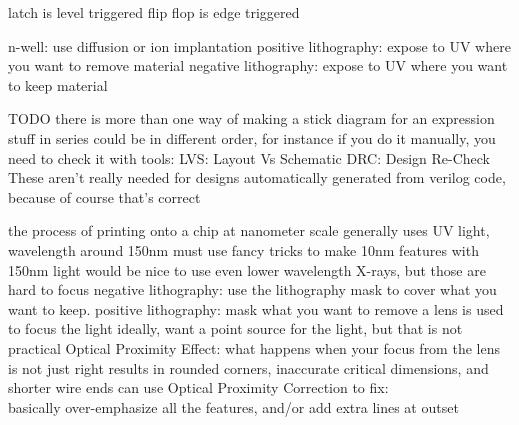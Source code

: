 \documentclass[12pt]{article}
\begin{document}
\begin{spacing}{0.8}
\begin{multicols*}{2}
\begin{flushleft}
\begin{outline}[longenum]
  \1 latch is level triggered
  \1 flip flop is edge triggered

  \1 n-well: use diffusion or ion implantation
  \1 positive lithography: expose to UV where you want to remove material
  \1 negative lithography: expose to UV where you want to keep material



  \1 TODO
  \1 there is more than one way of making a stick diagram for an expression
    \2 stuff in series could be in different order, for instance
  \1 if you do it manually, you need to check it with tools:
    \2 LVS: Layout Vs Schematic
    \2 DRC: Design Re-Check
    \2 These aren't really needed for designs automatically generated from verilog code, because of course that's correct

  \1 the process of printing onto a chip at nanometer scale
  \1 generally uses UV light, wavelength around 150nm
    \2 must use fancy tricks to make 10nm features with 150nm light
    \2 would be nice to use even lower wavelength X-rays, but those are hard to focus
  \1 negative lithography: use the lithography mask to cover what you want to keep.
  \1 positive lithography: mask what you want to remove
  \1 a lens is used to focus the light
    \2 ideally, want a point source for the light, but that is not practical
    \2 Optical Proximity Effect: what happens when your focus from the lens is not just right
    \2 results in rounded corners, inaccurate critical dimensions, and shorter wire ends
    \2 can use Optical Proximity Correction to fix:
    \\ basically over-emphasize all the features, and/or add extra lines at outset


\end{outline}
\end{flushleft}
\end{multicols*}
\end{spacing}
\end{document}
